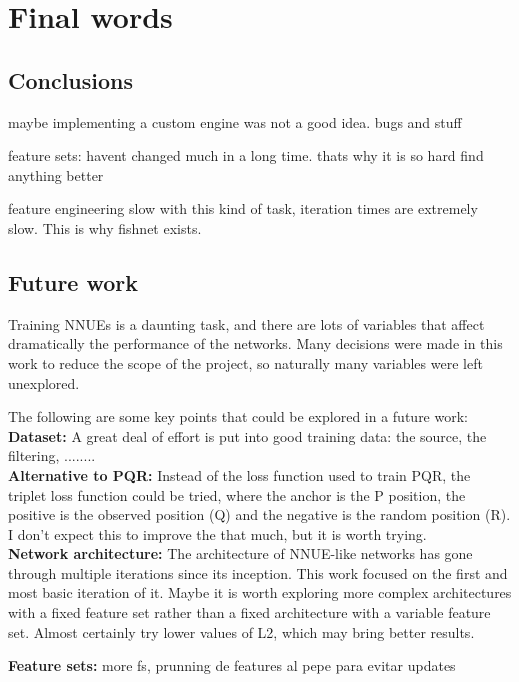 \section{Final words}
\subsection{Conclusions}

maybe implementing a custom engine was not a good idea. bugs and stuff

feature sets: havent changed much in a long time. thats why it is so hard find anything better

feature engineering slow with this kind of task, iteration times are extremely slow. This is why fishnet exists.




\subsection{Future work}

Training NNUEs is a daunting task, and there are lots of variables that affect dramatically the performance of the networks. Many decisions were made in this work to reduce the scope of the project, so naturally many variables were left unexplored.

The following are some key points that could be explored in a future work: \\

\textbf{Dataset:}
A great deal of effort is put into good training data: the source, the filtering, ........ 
\\

\textbf{Alternative to PQR:} Instead of the loss function used to train PQR, the triplet loss function could be tried, where the anchor is the P position, the positive is the observed position (Q) and the negative is the random position (R). I don't expect this to improve the that much, but it is worth trying. \\

\textbf{Network architecture:} The architecture of NNUE-like networks has gone through multiple iterations since its inception. This work focused on the first and most basic iteration of it. Maybe it is worth exploring more complex architectures with a fixed feature set rather than a fixed architecture with a variable feature set.
Almost certainly try lower values of L2, which may bring better results.


\textbf{Feature sets:} more fs, prunning de features al pepe para evitar updates
